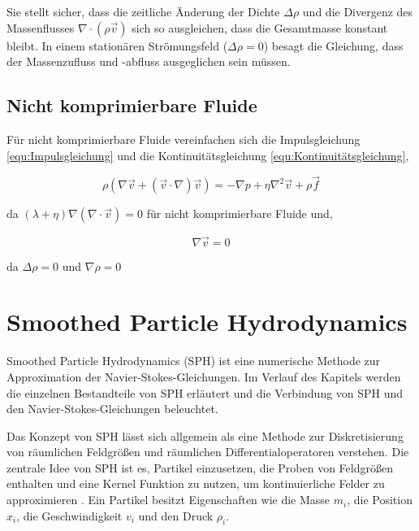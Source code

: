 \documentclass[a4paper, 12pt]{article}
\begin{document}
Sie stellt sicher, dass die zeitliche Änderung der Dichte \(\Delta \rho\) und die Divergenz des Massenflusses \(\nabla \cdot (\rho \vec{v})\) sich so ausgleichen, dass die Gesamtmasse konstant bleibt. In einem stationären Strömungsfeld (\(\Delta \rho = 0\)) besagt die Gleichung, dass der Massenzufluss und -abfluss ausgeglichen sein müssen.

\subsection{Nicht komprimierbare Fluide}
Für nicht komprimierbare Fluide vereinfachen sich die Impulsgleichung \eqref{equ:Impulsgleichung} und die Kontinuitätsgleichung \eqref{equ:Kontinuitätsgleichung},

\begin{equation} \label{equ:einfachImpulsgleichung}
	\rho(\nabla \vec{v} + (\vec{v} \cdot \nabla)\vec{v}) = - \nabla p + \eta \nabla^2 \vec{v} + \rho \vec{f}
\end{equation}

da \((\lambda + \eta)\nabla(\nabla \cdot \vec{v}) = 0\) für nicht komprimierbare Fluide und,

\begin{equation} \label{equ:einfachKontinuitätsgleichung}
	\nabla \vec{v} = 0
\end{equation}

da \(\Delta \rho = 0\) und \(\nabla\rho = 0\)

\section{Smoothed Particle Hydrodynamics} \label{Kap:SPH}
Smoothed Particle Hydrodynamics (SPH) ist eine numerische Methode zur Approximation der Navier-Stokes-Gleichungen. Im Verlauf des Kapitels werden die einzelnen Bestandteile von SPH erläutert und die Verbindung von SPH und den Navier-Stokes-Gleichungen beleuchtet.

Das Konzept von SPH lässt sich allgemein als eine Methode zur Diskretisierung von räumlichen Feldgrößen und räumlichen Differentialoperatoren verstehen. Die zentrale Idee von SPH ist es, Partikel einzusetzen, die Proben von Feldgrößen enthalten und eine Kernel Funktion zu nutzen, um kontinuierliche Felder zu approximieren \cite{huang2024journey}. Ein Partikel besitzt Eigenschaften wie die Masse \( m_i \), die Position \( x_i \), die Geschwindigkeit \( v_i \) und den Druck \( \rho_i \).
\end{document}
